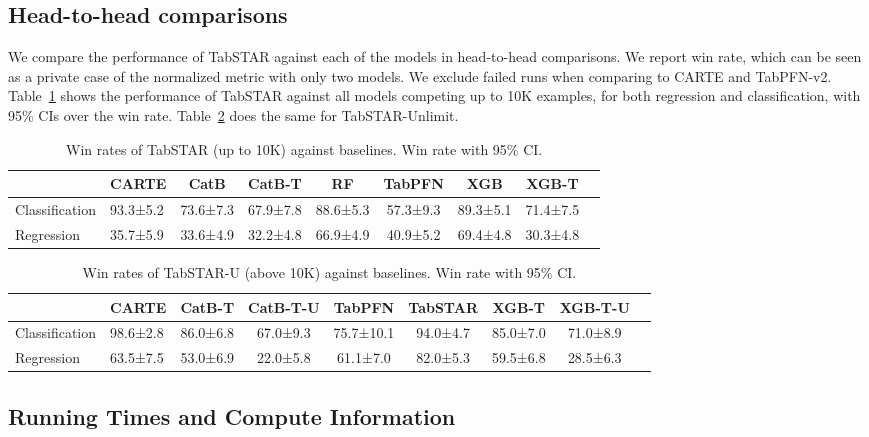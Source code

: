 \subsection{Head-to-head comparisons}
\label{app:res:head_to_head}

We compare the performance of TabSTAR against each of the models in head-to-head comparisons. We report win rate, which can be seen as a private case of the normalized metric with only two models. We exclude failed runs when comparing to CARTE and TabPFN-v2. Table~\ref{tab:head_10k} shows the performance of TabSTAR against all models competing up to 10K examples, for both regression and classification, with 95\% CIs over the win rate. Table~\ref{tab:head_unlimit} does the same for TabSTAR-Unlimit.

\begin{table}
\centering
\footnotesize
\caption{Win rates of TabSTAR (up to 10K) against baselines. Win rate with 95\% CI.}
\label{tab:head_10k}
\begin{tabular}{llccccccc}
\toprule
 & CARTE & CatB & CatB-T & RF & TabPFN & XGB & XGB-T \\
\midrule
Classification & 93.3±5.2 & 73.6±7.3 & 67.9±7.8 & 88.6±5.3 & 57.3±9.3 & 89.3±5.1 & 71.4±7.5 \\
Regression & 35.7±5.9 & 33.6±4.9 & 32.2±4.8 & 66.9±4.9 & 40.9±5.2 & 69.4±4.8 & 30.3±4.8 \\
\bottomrule
\end{tabular}
\end{table}

\begin{table}
\centering
\footnotesize
\caption{Win rates of TabSTAR-U (above 10K) against baselines. Win rate with 95\% CI.}
\label{tab:head_unlimit}
\begin{tabular}{llccccccc}
\toprule
 & CARTE & CatB-T & CatB-T-U & TabPFN & TabSTAR & XGB-T & XGB-T-U \\
\midrule
Classification & 98.6±2.8 & 86.0±6.8 & 67.0±9.3	 & 75.7±10.1 &	94.0±4.7 & 85.0±7.0 & 71.0±8.9 \\
Regression & 63.5±7.5 & 53.0±6.9 & 22.0±5.8 & 61.1±7.0 & 82.0±5.3 & 59.5±6.8 & 28.5±6.3 \\
\bottomrule
\end{tabular}
\end{table}


\subsection{Running Times and Compute Information}
\label{app:res:run_times}

